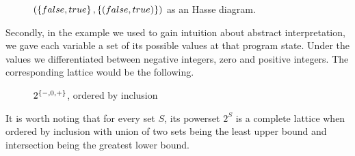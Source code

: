 \documentclass[..thesis.tex]{subfiles}
\begin{document}
\begin{figure}[H]
  \begin{center}
  \end{center}
  \caption{$\left( \left\lbrace false, true \right\rbrace, \left\lbrace \left( false, true \right) \right\rbrace \right)$ as an Hasse diagram.}
\end{figure}
 
Secondly, in the example we used to gain intuition about abstract interpretation, we gave each variable a set of its possible values at that program state. Under the values we differentiated between negative integers, zero and positive integers. The corresponding lattice would be the following.


\begin{figure}[H]
  \begin{center}
  \end{center}
  \caption{$2^{\left\lbrace -, 0, + \right\rbrace}$, ordered by inclusion}
\end{figure}

It is worth noting that for every set $S$, its powerset $2^S$ is a complete lattice when ordered by inclusion with union of two sets being the least upper bound and intersection being the greatest lower bound.
\end{document}
